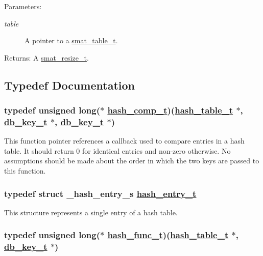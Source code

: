 \begin{Desc}
\item[Parameters:]
\begin{description}
\item[{\em table}]A pointer to a \hyperlink{group__dbprim__smat_a0}{smat\_\-table\_\-t}.\end{description}
\end{Desc}
\begin{Desc}
\item[Returns:]A \hyperlink{group__dbprim__smat_a3}{smat\_\-resize\_\-t}. \end{Desc}


\subsection{Typedef Documentation}
\hypertarget{group__dbprim__hash_a4}{
\subsubsection[hash\_\-comp\_\-t]{\setlength{\rightskip}{0pt plus 5cm}typedef unsigned long($\ast$ \hyperlink{dbprim_8h_a4}{hash\_\-comp\_\-t})(\hyperlink{dbprim_8h_a0}{hash\_\-table\_\-t} $\ast$, \hyperlink{dbprim_8h_a0}{db\_\-key\_\-t} $\ast$, \hyperlink{dbprim_8h_a0}{db\_\-key\_\-t} $\ast$)}}
\label{group__dbprim__hash_a4}


This function pointer references a callback used to compare entries in a hash table. It should return 0 for identical entries and non-zero otherwise. No assumptions should be made about the order in which the two keys are passed to this function. \hypertarget{group__dbprim__hash_a1}{
\subsubsection[hash\_\-entry\_\-t]{\setlength{\rightskip}{0pt plus 5cm}typedef struct \_\-hash\_\-entry\_\-s \hyperlink{dbprim_8h_a1}{hash\_\-entry\_\-t}}}
\label{group__dbprim__hash_a1}


This structure represents a single entry of a hash table. \hypertarget{group__dbprim__hash_a3}{
\subsubsection[hash\_\-func\_\-t]{\setlength{\rightskip}{0pt plus 5cm}typedef unsigned long($\ast$ \hyperlink{dbprim_8h_a3}{hash\_\-func\_\-t})(\hyperlink{dbprim_8h_a0}{hash\_\-table\_\-t} $\ast$, \hyperlink{dbprim_8h_a0}{db\_\-key\_\-t} $\ast$)}}
\label{group__dbprim__hash_a3}


